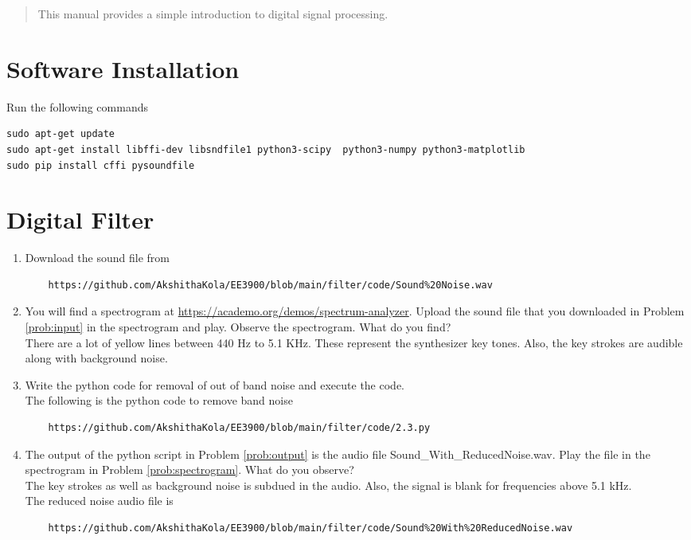 \documentclass[journal,12pt,twocolumn]{IEEEtran}
\renewcommand\thesection{\arabic{section}}
\begin{document}
\begin{abstract}
This manual provides a simple introduction to digital signal processing.
\end{abstract}

\section{Software Installation}
Run the following commands
\begin{lstlisting}
sudo apt-get update
sudo apt-get install libffi-dev libsndfile1 python3-scipy  python3-numpy python3-matplotlib 
sudo pip install cffi pysoundfile 
\end{lstlisting}

\section{Digital Filter}
\begin{enumerate}[label=\thesection.\arabic*
,ref=\thesection.\theenumi]
\item
\label{prob:input}
Download the sound file from  
\begin{lstlisting}
	https://github.com/AkshithaKola/EE3900/blob/main/filter/code/Sound%20Noise.wav
\end{lstlisting}


\item
\label{prob:spectrogram}
You will find a spectrogram at \href{https://academo.org/demos/spectrum-analyzer}{\url{https://academo.org/demos/spectrum-analyzer}}. 
Upload the sound file that you downloaded in Problem \ref{prob:input} in the spectrogram  and play.  Observe the spectrogram. What do you find?\\
\solution There are a lot of yellow lines between 440 Hz to 5.1 KHz.  These represent the synthesizer key tones. Also, the key strokes
are audible along with background noise.

\item
\label{prob:output}
Write the python code for removal of out of band noise and execute the code.
\\
\solution The following is the python code to remove band noise
\begin{lstlisting}
	https://github.com/AkshithaKola/EE3900/blob/main/filter/code/2.3.py
\end{lstlisting}

\item
The output of the python script in Problem \ref{prob:output} is the audio file Sound\_With\_ReducedNoise.wav. Play the file in the spectrogram in Problem \ref{prob:spectrogram}. What do you observe?
\\
\solution The key strokes as well as background noise is subdued in the audio.  Also,  the signal is blank for frequencies above 5.1 kHz.\\
The reduced noise audio file is
\begin{lstlisting}
	https://github.com/AkshithaKola/EE3900/blob/main/filter/code/Sound%20With%20ReducedNoise.wav
\end{lstlisting}
\end{enumerate}
\end{document}
